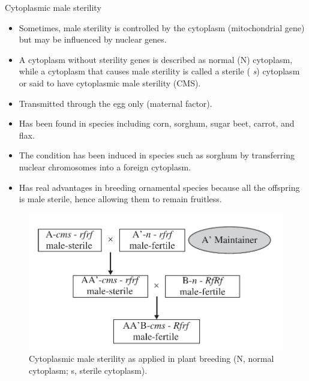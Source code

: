 \documentclass[11pt,ignorenonframetext,aspectratio=169]{beamer}
\providecommand{\tightlist}{%
  \setlength{\itemsep}{0pt}\setlength{\parskip}{0pt}}
\begin{document}
\begin{frame}{Cytoplasmic male sterility}
\protect\hypertarget{cytoplasmic-male-sterility}{}
\begin{itemize}
\tightlist
\item
  Sometimes, male sterility is controlled by the cytoplasm
  (mitochondrial gene) but may be influenced by nuclear genes.
\item
  A cytoplasm without sterility genes is described as normal (N)
  cytoplasm, while a cytoplasm that causes male sterility is called a
  sterile ( \emph{s}) cytoplasm or said to have cytoplasmic male
  sterility (CMS).
\item
  Transmitted through the egg only (maternal factor).
\item
  Has been found in species including corn, sorghum, sugar beet, carrot,
  and flax.
\item
  The condition has been induced in species such as sorghum by
  transferring nuclear chromosomes into a foreign cytoplasm.
\item
  Has real advantages in breeding ornamental species because all the
  offspring is male sterile, hence allowing them to remain fruitless.
\end{itemize}
\end{frame}

\begin{frame}{}
\protect\hypertarget{section-13}{}
\begin{figure}

{\centering \includegraphics[width=0.5\linewidth]{./images/cms_use} 

}

\caption{Cytoplasmic male sterility as applied in plant breeding (N, normal cytoplasm; s, sterile cytoplasm).}\label{fig:cms-use}
\end{figure}
\end{frame}
\end{document}
